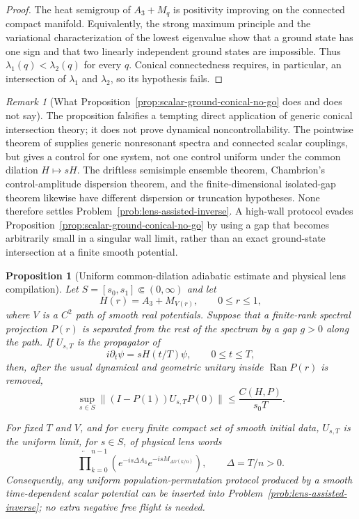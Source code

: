 \documentclass[11pt]{article}
\newtheorem{proposition}[theorem]{Proposition}
\theoremstyle{remark}
\newtheorem{remark}[theorem]{Remark}
\begin{document}
\begin{proof}
The heat semigroup of $A_3+M_q$ is positivity improving on the connected
compact manifold.  Equivalently, the strong maximum principle and the
variational characterization of the lowest eigenvalue show that a ground
state has one sign and that two linearly independent ground states are
impossible.  Thus $\lambda_1(q)<\lambda_2(q)$ for every $q$.  Conical
connectedness requires, in particular, an intersection of
$\lambda_1$ and $\lambda_2$, so its hypothesis fails.
\end{proof}

\begin{remark}[What Proposition~\ref{prop:scalar-ground-conical-no-go} does
and does not say]
The proposition falsifies a tempting direct application of generic conical
intersection theory; it does not prove dynamical noncontrollability.  The
pointwise theorem of \cite{MasonSigalotti2010} supplies generic nonresonant
spectra and connected scalar couplings, but gives a control for one system,
not one control uniform under the common dilation
$H\mapsto sH$.  The driftless semisimple ensemble theorem, Chambrion's
control-amplitude dispersion theorem, and the finite-dimensional isolated-gap
theorem likewise have different dispersion or truncation hypotheses.  None
therefore settles Problem~\ref{prob:lens-assisted-inverse}.  A high-wall
protocol evades Proposition~\ref{prop:scalar-ground-conical-no-go} by using a
gap that becomes arbitrarily small in a singular wall limit, rather than an
exact ground-state intersection at a finite smooth potential.
\end{remark}

\begin{proposition}[Uniform common-dilation adiabatic estimate and physical
lens compilation]
\label{prop:uniform-adiabatic-lens-compilation}
Let $S=[s_0,s_1]\Subset(0,\infty)$ and let
\[
 H(r)=A_3+M_{V(r)},\qquad 0\leq r\leq1,
\]
where $V$ is a $C^2$ path of smooth real potentials.  Suppose that a
finite-rank spectral projection $P(r)$ is separated from the rest of the
spectrum by a gap $g>0$ along the path.  If $U_{s,T}$ is the propagator of
\[
 i\partial_t\psi=sH(t/T)\psi,\qquad0\leq t\leq T,
\]
then, after the usual dynamical and geometric unitary inside
$\operatorname{Ran}P(r)$ is removed,
\begin{equation}
 \sup_{s\in S}
 \|(I-P(1))U_{s,T}P(0)\|
 \leq \frac{C(H,P)}{s_0T}.
 \label{eq:uniform-common-dilation-adiabatic}
\end{equation}

For fixed $T$ and $V$, and for every finite compact set of smooth initial
data, $U_{s,T}$ is the uniform limit, for $s\in S$, of physical lens words
\begin{equation}
 \overleftarrow{\prod}_{k=0}^{n-1}
 \left(
  e^{-is\Delta A_3}
  e^{-isM_{\Delta V(k/n)}}
 \right),
 \qquad \Delta=T/n>0.
 \label{eq:adiabatic-lens-trotter}
\end{equation}
Consequently, any uniform population-permutation protocol produced by a
smooth time-dependent scalar potential can be inserted into
Problem~\ref{prob:lens-assisted-inverse}; no extra negative free flight is
needed.
\end{proposition}
\end{document}
